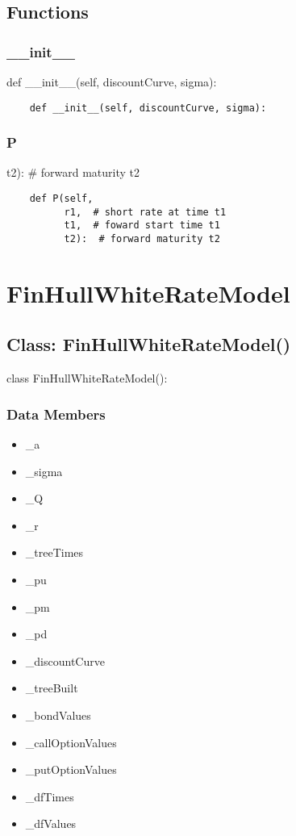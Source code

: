 \documentclass[twoside,11pt]{book}
\begin{document}
\subsection*{Functions}

\subsubsection*{{\bf \_\_init\_\_}}
def \_\_init\_\_(self, discountCurve, sigma): 

\begin{lstlisting}
    def __init__(self, discountCurve, sigma):
\end{lstlisting}

\subsubsection*{{\bf P}}
t2):  \# forward maturity t2 

\begin{lstlisting}
    def P(self,
          r1,  # short rate at time t1
          t1,  # foward start time t1
          t2):  # forward maturity t2
\end{lstlisting}

\newpage
\section{FinHullWhiteRateModel}

\subsection*{Class: FinHullWhiteRateModel()}
class FinHullWhiteRateModel(): 

\subsubsection*{Data Members}
\begin{itemize}
\item{\_a}
\item{\_sigma}
\item{\_Q}
\item{\_r}
\item{\_treeTimes}
\item{\_pu}
\item{\_pm}
\item{\_pd}
\item{\_discountCurve}
\item{\_treeBuilt}
\item{\_bondValues}
\item{\_callOptionValues}
\item{\_putOptionValues}
\item{\_dfTimes}
\item{\_dfValues}
\end{itemize}
\end{document}
